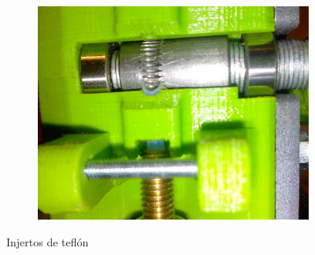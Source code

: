 \documentclass[11pt,a4paper]{article}
\begin{document}
\begin{figure}[H]
    ~ %
    \begin{subfigure}[b]{0.3\textwidth}
        \includegraphics[width=\textwidth,cfbox=azul_marcos 4pt 0pt]{FOTOS/TEFLON3}
    \end{subfigure}
    \caption*{Injertos de teflón}
\end{figure}
\end{document}
